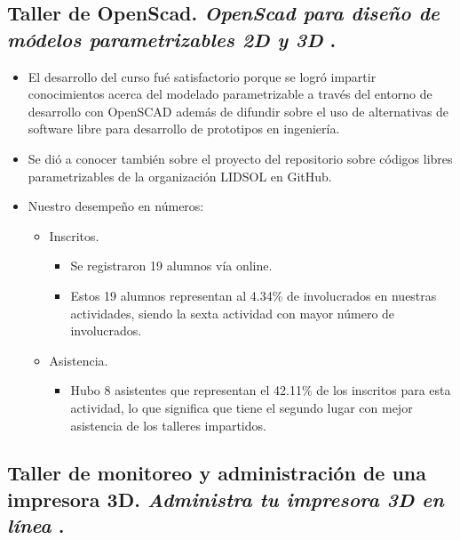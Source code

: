 \documentclass[a4paper,11pt]{article}                 %
\begin{document}
  \subsection{Taller de OpenScad. \textit{OpenScad para diseño de módelos parametrizables 2D y 3D} .}
  
  \begin{itemize}
    \item El desarrollo del curso fué satisfactorio porque se logró impartir conocimientos acerca del modelado parametrizable a través del entorno de desarrollo con OpenSCAD además de difundir sobre el uso de alternativas de software libre para desarrollo de prototipos en ingeniería.
    
    \item Se dió a conocer también sobre el proyecto del repositorio sobre códigos libres parametrizables de la organización LIDSOL en GitHub.
    
    
    \item Nuestro desempeño en números:
    
    \begin{itemize}

    
    \item Inscritos.
    \begin{itemize}
      \item Se registraron 19 alumnos vía online.
      \item Estos 19 alumnos representan al 4.34\% de involucrados en nuestras actividades, siendo la sexta actividad con mayor número de involucrados. 
    \end{itemize}
    
    \item Asistencia.
    \begin{itemize}
      \item Hubo 8 asistentes que representan el 42.11\% de los inscritos para esta actividad, lo que significa que tiene el segundo lugar con mejor asistencia de los talleres impartidos. 
    \end{itemize}
    \end{itemize} 
    
  \end{itemize}
  
  
  \subsection{Taller de monitoreo y administración de una impresora 3D. \textit{Administra tu impresora 3D en línea} .}  
  
\end{document}
